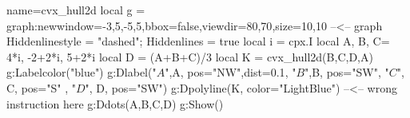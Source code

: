 \documentclass[border=2 mm]{standalone}
\begin{document}
\begin{luadraw}{name=cvx_hull2d}
local g = graph:new{window={-3,5,-5,5},bbox=false,viewdir={80,70},size={10,10}} --<-- graph
Hiddenlinestyle = "dashed"; Hiddenlines = true
local i = cpx.I
local A, B, C= 4*i, -2+2*i, 5+2*i
local D = (A+B+C)/3  
local K = cvx_hull2d({B,C,D,A})
g:Labelcolor("blue") 
g:Dlabel("$A$",A, {pos="NW",dist=0.1}, "$B$",B, {pos="SW"}, "$C$", C, {pos="S" },  "$D$", D, {pos="SW"})
g:Dpolyline(K, {color="LightBlue"})  --<-- wrong instruction here
g:Ddots({A,B,C,D})
g:Show()
\end{luadraw} 
\end{document}
